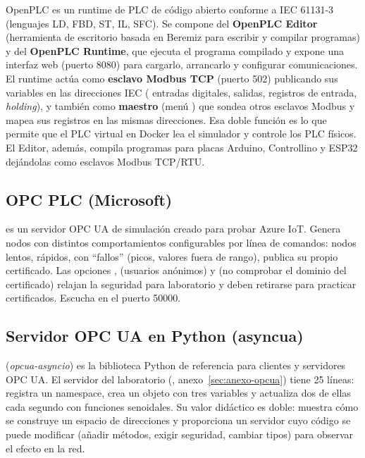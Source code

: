 OpenPLC es un runtime de PLC de código abierto conforme a IEC 61131-3 (lenguajes LD, FBD, ST, IL, SFC). Se compone del \textbf{OpenPLC Editor} (herramienta de escritorio basada en Beremiz para escribir y compilar programas) y del \textbf{OpenPLC Runtime}, que ejecuta el programa compilado y expone una interfaz web (puerto 8080) para cargarlo, arrancarlo y configurar comunicaciones. El runtime actúa como \textbf{esclavo Modbus TCP} (puerto 502) publicando sus variables en las direcciones IEC ( entradas digitales,  salidas,  registros de entrada,  \emph{holding}), y también como \textbf{maestro} (menú ) que sondea otros esclavos Modbus y mapea sus registros en las mismas direcciones. Esa doble función es lo que permite que el PLC virtual en Docker lea el simulador y controle los PLC físicos. El Editor, además, compila programas para placas Arduino, Controllino y ESP32 dejándolas como esclavos Modbus TCP/RTU.

\subsection{OPC PLC (Microsoft)}

 es un servidor OPC UA de simulación creado para probar Azure IoT. Genera nodos con distintos comportamientos configurables por línea de comandos:  nodos lentos,  rápidos,  con ``fallos'' (picos, valores fuera de rango),  publica su propio certificado. Las opciones ,  (usuarios anónimos) y  (no comprobar el dominio del certificado) relajan la seguridad para laboratorio y deben retirarse para practicar certificados. Escucha en el puerto 50000.

\subsection{Servidor OPC UA en Python (asyncua)}

 (\emph{opcua-asyncio}) es la biblioteca Python de referencia para clientes y servidores OPC UA. El servidor del laboratorio (, anexo~\ref{sec:anexo-opcua}) tiene 25 líneas: registra un namespace, crea un objeto con tres variables y actualiza dos de ellas cada segundo con funciones senoidales. Su valor didáctico es doble: muestra cómo se construye un espacio de direcciones y proporciona un servidor cuyo código se puede modificar (añadir métodos, exigir seguridad, cambiar tipos) para observar el efecto en la red.

